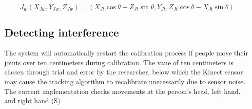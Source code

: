 \begin{equation}[!h]
\label{eq:joint_worldview}
J_w (X_{Jw}, Y_{Jw}, Z_{Jw}) = (X_{Jt}\cos\theta + Z_{Jt}\sin\theta, Y_{Jt}, Z_{Jt}\cos\theta - X_{Jt}\sin\theta)
\end{equation}





\subsection{Detecting interference}

The system will automatically restart the calibration process if people move their joints over ten centimeters during calibration. The vaue of ten centimeters is chosen through trial and error by the researcher, below which the Kinect sensor may cause the tracking algorithm to recalibrate unecessarily due to sensor noise. The current implementation checks movements at the person's head, left hand, and right hand (S)

